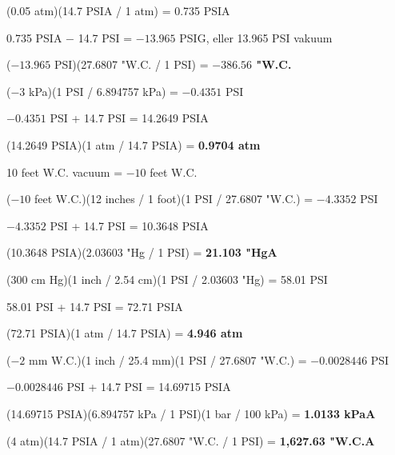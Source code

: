 \vskip 10pt


(0.05 atm)(14.7 PSIA / 1 atm) = 0.735 PSIA

0.735 PSIA $-$ 14.7 PSI = $-13.965$ PSIG, eller 13.965 PSI vakuum

($-13.965$ PSI)(27.6807 "W.C. / 1 PSI) = {\bf $-386.56$ "W.C.}


\vskip 10pt


($-3$ kPa)(1 PSI / 6.894757 kPa) = $-0.4351$ PSI

$-0.4351$ PSI + 14.7 PSI = 14.2649 PSIA

(14.2649 PSIA)(1 atm / 14.7 PSIA) = {\bf 0.9704 atm}


\vskip 10pt


10 feet W.C. vacuum = $-10$ feet W.C.

($-10$ feet W.C.)(12 inches / 1 foot)(1 PSI / 27.6807 "W.C.) = $-4.3352$ PSI

$-4.3352$ PSI + 14.7 PSI = 10.3648 PSIA

(10.3648 PSIA)(2.03603 "Hg / 1 PSI) = {\bf 21.103 "HgA}


\vskip 10pt


(300 cm Hg)(1 inch / 2.54 cm)(1 PSI / 2.03603 "Hg) = 58.01 PSI

58.01 PSI + 14.7 PSI = 72.71 PSIA

(72.71 PSIA)(1 atm / 14.7 PSIA) = {\bf 4.946 atm}


\vskip 10pt


($-2$ mm W.C.)(1 inch / 25.4 mm)(1 PSI / 27.6807 "W.C.) = $-0.0028446$ PSI

$-0.0028446$ PSI + 14.7 PSI = 14.69715 PSIA

(14.69715 PSIA)(6.894757 kPa / 1 PSI)(1 bar / 100 kPa) = {\bf 1.0133 kPaA}


\vskip 10pt


(4 atm)(14.7 PSIA / 1 atm)(27.6807 "W.C. / 1 PSI) = {\bf 1,627.63 "W.C.A}




